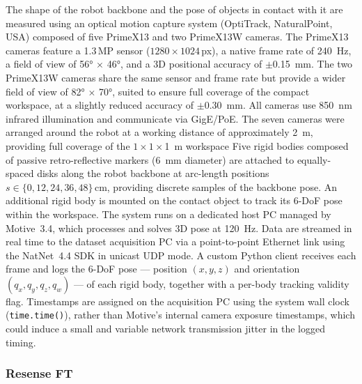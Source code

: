 \documentclass[14pt, a4paper]{article}
\begin{document}
The shape of the robot backbone and the pose of objects in contact with it are measured using an optical motion capture system (OptiTrack, NaturalPoint, USA) composed of five PrimeX13 and two PrimeX13W cameras. 
The PrimeX13 cameras feature a 1.3\,MP sensor ($1280 \times 1024$\,px), a native frame rate of \SI{240}{\hertz}, a field of view of \ang{56} $\times$ \ang{46}, and a 3D positional accuracy of $\pm$\SI{0.15}{\milli\metre}. 
The two PrimeX13W cameras share the same sensor and frame rate but provide a wider field of view of \ang{82} $\times$ \ang{70}, suited to ensure full coverage of the compact workspace, at a slightly reduced accuracy of $\pm$\SI{0.30}{\milli\metre}. 
All cameras use \SI{850}{\nano\metre} infrared illumination and communicate via GigE/PoE. 
The seven cameras were arranged around the robot at a working distance of approximately \SI{2}{\metre}, providing full coverage of the $1\times1\times$\SI{1}{\metre} workspace
Five rigid bodies composed of passive retro-reflective markers (\SI{6}{\milli\metre} diameter) are attached to equally-spaced disks along the robot backbone at arc-length positions $s \in \{0, 12, 24, 36, 48\}$\,cm, providing discrete samples of the backbone pose. 
An additional rigid body is mounted on the contact object to track its 6-DoF pose within the workspace. The system runs on a dedicated host PC managed by Motive~3.4, which processes and solves 3D pose at \SI{120}{\hertz}. 
Data are streamed in real time to the dataset acquisition PC via a point-to-point Ethernet link 
using the NatNet~4.4 SDK in unicast UDP mode. 
A custom Python client receives each frame and logs the 6-DoF pose --- position $(x, y, z)$ and orientation $(q_x, q_y, q_z, q_w)$ --- of each rigid body, together with a per-body tracking validity flag. 
Timestamps are assigned on the acquisition PC using the system wall clock (\texttt{time.time()}), rather than Motive's internal camera exposure timestamps, which could induce a small and variable network transmission jitter in the logged timing.



\subsubsection{Resense FT}
\end{document}
